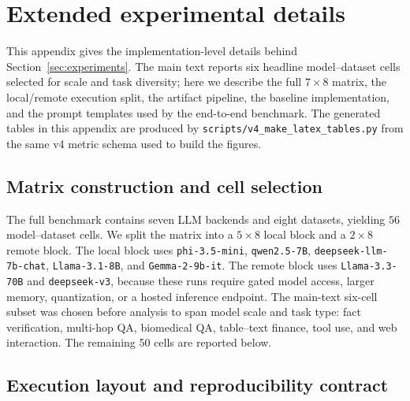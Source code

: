 
\section{Extended experimental details}
\label{appendix:exp_details}

This appendix gives the implementation-level details behind Section~\ref{sec:experiments}. The
main text reports six headline model--dataset cells selected for scale and task diversity; here we
describe the full \(7\times 8\) matrix, the local/remote execution split, the artifact pipeline, the
baseline implementation, and the prompt templates used by the end-to-end benchmark. The generated
tables in this appendix are produced by \texttt{scripts/v4\_make\_latex\_tables.py} from the same
v4 metric schema used to build the figures.

\subsection{Matrix construction and cell selection}
\label{appendix:exp_details:matrix}

The full benchmark contains seven LLM backends and eight datasets, yielding \(56\) model--dataset
cells. We split the matrix into a \(5\times 8\) local block and a \(2\times 8\) remote block. The
local block uses \texttt{phi-3.5-mini}, \texttt{qwen2.5-7B},
\texttt{deepseek-llm-7b-chat}, \texttt{Llama-3.1-8B}, and
\texttt{Gemma-2-9b-it}. The remote block uses \texttt{Llama-3.3-70B} and
\texttt{deepseek-v3}, because these runs require gated model access, larger memory, quantization,
or a hosted inference endpoint. The main-text six-cell subset was chosen before analysis to span
model scale and task type: fact verification, multi-hop QA, biomedical QA, table--text finance,
tool use, and web interaction. The remaining 50 cells are reported below.



\subsection{Execution layout and reproducibility contract}
\label{appendix:exp_details:execution}

